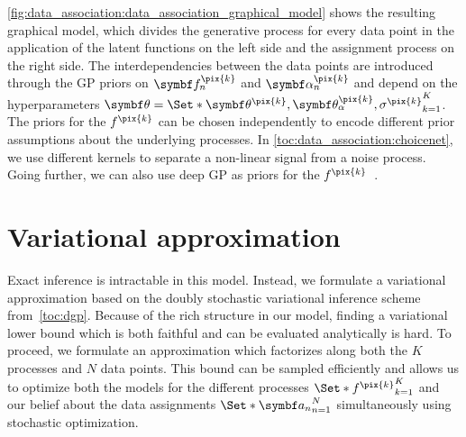\cref{fig:data_association:data_association_graphical_model} shows the resulting graphical model, which divides the generative process for every data point in the application of the latent functions on the left side and the assignment process on the right side.
The interdependencies between the data points are introduced through the GP priors on $\rv{f}_n^{\pix{k}}$ and $\rv{\alpha}_n^{\pix{k}}$ and depend on the hyperparameters $\mat{\theta} = \Set*{\mat{\theta}^{\pix{k}}, \mat{\theta}_\alpha^{\pix{k}}, \sigma^{\pix{k}}}_{k=1}^K$.
The priors for the $f^{\pix{k}}$ can be chosen independently to encode different prior assumptions about the underlying processes.
In \cref{toc:data_association:choicenet}, we use different kernels to separate a non-linear signal from a noise process.
Going further, we can also use deep GP as priors for the $f^{\pix{k}}$~\parencite{damianou_deep_2013, salimbeni_doubly_2017}.


\section{Variational approximation}
\label{toc:data_association:approximation}
Exact inference is intractable in this model.
Instead, we formulate a variational approximation based on the doubly stochastic variational inference scheme from~\cref{toc:dgp}.
Because of the rich structure in our model, finding a variational lower bound which is both faithful and can be evaluated analytically is hard.
To proceed, we formulate an approximation which factorizes along both the $K$ processes and $N$ data points.
This bound can be sampled efficiently and allows us to optimize both the models for the different processes $\Set*{f^{\pix{k}}}_{k=1}^K$ and our belief about the data assignments $\Set*{\mat{a}_n}_{n=1}^N$ simultaneously using stochastic optimization.

